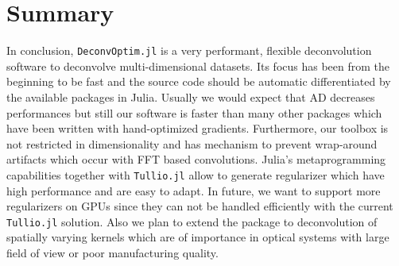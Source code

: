 \documentclass{juliacon}
\begin{document}
\section{Summary}
    In conclusion, \verb|DeconvOptim.jl| is a very performant, flexible deconvolution software to deconvolve multi-dimensional datasets.
    Its focus has been from the beginning to be fast and the source code should be automatic differentiated by the available
    packages in Julia. Usually we would expect that AD decreases performances but still our software is faster than
    many other packages which have been written with hand-optimized gradients.
    Furthermore, our toolbox is not restricted in dimensionality and has mechanism to prevent wrap-around artifacts which
    occur with FFT based convolutions.
    Julia's metaprogramming capabilities together with \verb|Tullio.jl| allow to generate regularizer which have high performance
    and are easy to adapt.
    In future, we want to support more regularizers on GPUs since they can not be handled efficiently with the current \verb|Tullio.jl| solution.
    Also we plan to extend the package to deconvolution of spatially varying kernels which are of importance in optical systems
    with large field of view or poor manufacturing quality.



\end{document}
